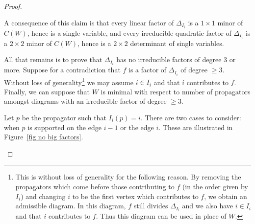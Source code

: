 \documentclass[11pt]{article}
\theoremstyle{remark}
\theoremstyle{definition}
\begin{document}
\begin{proof}
\begin{enumerate}
A consequence of this claim is that every linear factor of $\Delta_{I_i}$ is a $1\times 1$ minor of $C(W)$, hence is a single variable, and every irreducible quadratic factor of $\Delta_{I_i}$ is a $2\times 2$ minor of $C(W)$, hence is a $2\times 2$ determinant of single variables.

All that remains is to prove that $\Delta_{I_i}$ has no irreducible factors of degree 3 or more.  Suppose for a contradiction that $f$ is a factor of $\Delta_{I_i}$ of degree $\geq 3$. Without loss of generality\footnote{This is without loss of generality for the following reason.  By removing the propagators which come before those contributing to $f$ (in the order given by $I_i$) and changing $i$ to be the first vertex which contributes to $f$, we obtain an admissible diagram.  In this diagram, $f$ still divides $\Delta_{I_i}$ and we also have $i\in I_i$ and that 
$i$ contributes to $f$.  Thus this diagram can be used in place of $W$.} we may assume $i\in I_i$ and that $i$ contributes to $f$.
Finally, we can suppose that $W$ is minimal with respect to number of propagators amongst diagrams with an irreducible factor of degree $\geq 3$. 

Let $p$ be the propagator such that $I_i(p) = i$. There are two cases to consider: when $p$ is supported on the edge $i-1$ or the edge $i$.  These are illustrated in Figure~\ref{fig no big factors}.





\end{enumerate}
\end{proof}
\end{document}
